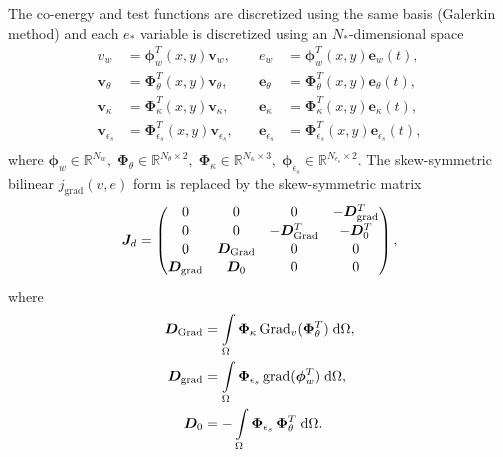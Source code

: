 \documentclass{ifacconf}
\begin{document}
The co-energy and test functions are discretized using the same basis (Galerkin method)  and each $e_*$ variable is discretized using an $N_*$-dimensional space
\begin{equation}
\begin{aligned}
v_w &= \bm{\phi}^T_w(x,y) \bm{v}_w,\\
\bm{v}_\theta &= \bm{\Phi}^T_\theta(x,y) \bm{v}_\theta,\\
\bm{v}_\kappa &= \bm{\Phi}^T_\kappa(x,y) \bm{v}_\kappa,\\
\bm{v}_{\epsilon_s} &= \bm{\Phi}^T_{\epsilon_s}(x,y) \bm{v}_{\epsilon_s},\\
\end{aligned} \quad 
\begin{aligned}
e_w &= \bm{\phi}^T_w(x,y) \bm{e}_w(t),\\
\bm{e}_\theta &= \bm{\Phi}^T_\theta(x,y) \bm{e}_\theta(t),\\
\bm{e}_\kappa &= \bm{\Phi}^T_\kappa(x,y) \bm{e}_\kappa(t),\\
\bm{e}_{\epsilon_s} &= \bm{\Phi}^T_{\epsilon_s}(x,y) \bm{e}_{\epsilon_s}(t),\\
\end{aligned}
\end{equation}
where $\bm{\phi}_w \in \mathbb{R}^{N_w}, \; \bm{\Phi}_\theta \in \mathbb{R}^{N_\theta \times 2}, \; \bm{\Phi}_\kappa \in \mathbb{R}^{N_\kappa \times 3}, \; \bm{\phi}_{\epsilon_s} \in \mathbb{R}^{N_{\epsilon_s} \times 2}$.
The skew-symmetric bilinear $j_{\text{grad}}(v, e)$ form is replaced by the skew-symmetric matrix
\begin{equation}
	\bm{J}_d = 
	\begin{pmatrix}
	0 & 0 & 0 & -\bm{D}_{\mathrm{grad}}^T      \vspace{.3mm}\\ 
	0 & 0 & -\bm{D}_{\mathrm{Grad}}^T & -\bm{D}_0^T \vspace{.3mm}\\
	0 & \bm{D}_{\mathrm{Grad}} & 0 & 0         \vspace{.3mm}\\
	\bm{D}_{\mathrm{grad}} & \bm{D}_0 & 0 & 0       \vspace{.3mm}\\
	\end{pmatrix},
\end{equation}
where 
\begin{equation}
\begin{aligned}
\bm{D}_{\mathrm{Grad}} &= \int_{\Omega} \bm{\Phi}_{\kappa} \, \mathrm{Grad}_v(\bm{\Phi}^T_{\theta}) \d\Omega, \\
\bm{D}_{\mathrm{grad}} &= \int_{\Omega} \bm{\Phi}_{\epsilon_s} \,  \mathrm{grad}(\bm{\phi}^T_{w}) \d\Omega, \\
\bm{D}_0  &= -\int_{\Omega} \bm{\Phi}_{\epsilon_s} \,  \bm{\Phi}^T_{\theta} \d\Omega. \\
\end{aligned}
\end{equation}
\end{document}
